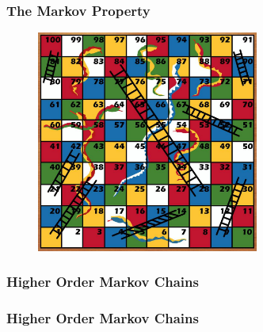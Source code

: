 \documentclass{beamer}
\begin{document}
\begin{frame}
\frametitle{The Markov Property}
\begin{figure}
  \includegraphics[width=0.65\textwidth]{snakes_and_ladders}
\end{figure}
\end{frame}



\begin{frame}
\frametitle{Higher Order Markov Chains}
\begin{figure}
  
\end{figure}
\end{frame}

\begin{frame}
\frametitle{Higher Order Markov Chains}
\begin{figure}
  
\end{figure}
\end{frame}



\begin{frame}
\begin{figure}
  
\end{figure}
\end{frame}
\begin{frame}
\begin{figure}
  
\end{figure}
\end{frame}
\begin{frame}
\begin{figure}
  
\end{figure}
\end{frame}
\end{document}
